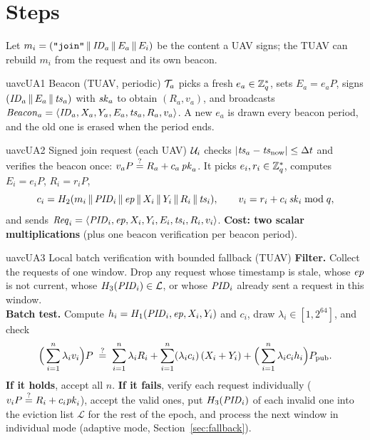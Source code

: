 \section{Steps}
Let $m_i=(\texttt{"join"}\,\|\,\mathit{ID}_a\,\|\, E_a\,\|\, E_i)$ be the content a UAV signs; the TUAV can rebuild $m_i$ from the request and its own beacon.

\begin{stepbox}{uavc}{UA1 \;Beacon (TUAV, periodic)}
$\mathcal{T}_a$ picks a fresh $e_a\in\mathbb{Z}_q^{*}$, sets $E_a=e_aP$, signs $(\mathit{ID}_a\,\|\, E_a\,\|\,\mathit{ts}_a)$ with $\mathit{sk}_a$ to obtain $(R_a,v_a)$, and broadcasts
$\mathit{Beacon}_a=\langle\mathit{ID}_a,X_a,Y_a,E_a,\mathit{ts}_a,R_a,v_a\rangle$. A new $e_a$ is drawn every beacon period, and the old one is erased when the period ends.
\end{stepbox}

\begin{stepbox}{uavc}{UA2 \;Signed join request (each UAV)}
$\mathcal{U}_i$ checks $|\mathit{ts}_a-\mathit{ts}_{\mathrm{now}}|\le\Delta t$ and verifies the beacon once: $v_aP\overset{?}{=}R_a+c_a\,\mathit{pk}_a$.
It picks $e_i,r_i\in\mathbb{Z}_q^{*}$, computes $E_i=e_iP$, $R_i=r_iP$,
\[
  c_i=H_2(m_i\,\|\,\mathit{PID}_i\,\|\,\mathit{ep}\,\|\, X_i\,\|\, Y_i\,\|\, R_i\,\|\,\mathit{ts}_i),\qquad v_i=r_i+c_i\,\mathit{sk}_i \bmod q,
\]
and sends $\mathit{Req}_i=\langle\mathit{PID}_i,\mathit{ep},X_i,Y_i,E_i,\mathit{ts}_i,R_i,v_i\rangle$.
\textbf{Cost: two scalar multiplications} (plus one beacon verification per beacon period).
\end{stepbox}

\begin{stepbox}{uavc}{UA3 \;Local batch verification with bounded fallback (TUAV)}
\textbf{Filter.} Collect the requests of one window. Drop any request whose timestamp is stale, whose $\mathit{ep}$ is not current, whose $H_3(\mathit{PID}_i)\in\mathcal{L}$,
or whose $\mathit{PID}_i$ already sent a request in this window.\\[2pt]
\textbf{Batch test.} Compute $h_i=H_1(\mathit{PID}_i,\mathit{ep},X_i,Y_i)$ and $c_i$, draw $\lambda_i\in[1,2^{64}]$, and check
\begin{equation}
  \Big(\sum_{i=1}^{n}\lambda_iv_i\Big)P\;\overset{?}{=}\;\sum_{i=1}^{n}\lambda_iR_i+\sum_{i=1}^{n}(\lambda_ic_i)\,(X_i+Y_i)+\Big(\sum_{i=1}^{n}\lambda_ic_ih_i\Big)P_{\mathrm{pub}} .\label{eq:bv}
\end{equation}
\textbf{If it holds}, accept all $n$. \textbf{If it fails}, verify each request individually ($v_iP\overset{?}{=}R_i+c_i\mathit{pk}_i$), accept the valid ones,
put $H_3(\mathit{PID}_i)$ of each invalid one into the eviction list $\mathcal{L}$ for the rest of the epoch, and process the next window in individual mode
(adaptive mode, Section~\ref{sec:fallback}).
\end{stepbox}

